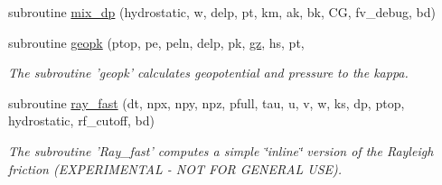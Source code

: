 \begin{DoxyCompactItemize}
\item 
subroutine \hyperlink{classdyn__core__mod_aeec216067740dcbbd70b4b0acc7a7c7e}{mix\-\_\-dp} (hydrostatic, w, delp, pt, km, ak, bk, C\-G, fv\-\_\-debug, bd)
\item 
subroutine \hyperlink{classdyn__core__mod_a3afb820ed44d6ca5137ba0c6205ea141}{geopk} (ptop, pe, peln, delp, pk, \hyperlink{classdyn__core__mod_add08631b5675064954c9123f29da8d9c}{gz}, hs, pt,
\begin{DoxyCompactList}\small\item\em The subroutine 'geopk' calculates geopotential and pressure to the kappa. \end{DoxyCompactList}\item 
subroutine \hyperlink{classdyn__core__mod_a23759cc821cf3c1bdb08a0bce8863cc6}{ray\-\_\-fast} (dt, npx, npy, npz, pfull, tau, u, v, w, ks, dp, ptop, hydrostatic, rf\-\_\-cutoff, bd)
\begin{DoxyCompactList}\small\item\em The subroutine 'Ray\-\_\-fast' computes a simple \char`\"{}inline\char`\"{} version of the Rayleigh friction (E\-X\-P\-E\-R\-I\-M\-E\-N\-T\-A\-L -\/ N\-O\-T F\-O\-R G\-E\-N\-E\-R\-A\-L U\-S\-E). \end{DoxyCompactList}\end{DoxyCompactItemize}
